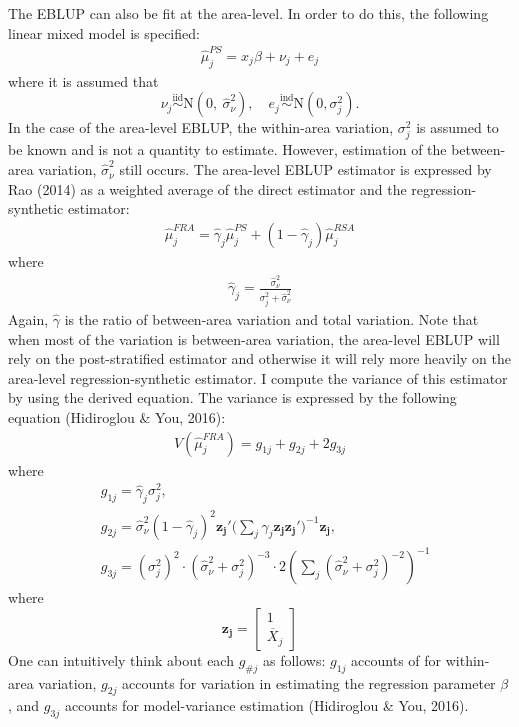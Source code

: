 \documentclass[12pt,twoside]{reedthesis}
\begin{document}
The EBLUP can also be fit at the area-level. In order to do this, the following linear mixed model is specified:
\begin{align}
\hat\mu_{j}^{PS} = x_j \beta + \nu_j + e_j \label{eq:area-mod}
\end{align}
where it is assumed that
\[
 \newcommand\myeq{\stackrel{\mathclap{\normalfont\mbox{s}}}{~}}
\nu_j \stackrel{\text{iid}}{\sim} \text{N}(0,~ \hat\sigma^2_{\nu}), \quad e_{j} \stackrel{\text{ind}}{\sim}\text{N}(0, \sigma^2_j).
\]
In the case of the area-level EBLUP, the within-area variation, \(\sigma^2_j\) is assumed to be known and is not a quantity to estimate. However, estimation of the between-area variation, \(\hat\sigma_\nu^2\) still occurs. The area-level EBLUP estimator is expressed by Rao (2014) as a weighted average of the direct estimator and the regression-synthetic estimator:
\begin{align}
\hat \mu_j^{FRA} = \hat\gamma_j \hat\mu_j^{PS} + (1 - \hat\gamma_j) \hat\mu_j^{RSA} \label{eq:eblup-area-weight}
\end{align}
where
\begin{align}
\hat \gamma_j = \frac{\hat \sigma_\nu^2}{\sigma^2_j + \hat\sigma_\nu^2}
\end{align}
Again, \(\hat\gamma\) is the ratio of between-area variation and total variation. Note that when most of the variation is between-area variation, the area-level EBLUP will rely on the post-stratified estimator and otherwise it will rely more heavily on the area-level regression-synthetic estimator. I compute the variance of this estimator by using the derived equation. The variance is expressed by the following equation (Hidiroglou \& You, 2016):
\begin{align}
\hat V(\hat\mu_j^{FRA}) = g_{1j} + g_{2j} + 2g_{3j}
\end{align}
where
\begin{align*}
&g_{1j} = \hat\gamma_j \sigma^2_j, \\
&g_{2j} = \hat\sigma^2_\nu (1 - \hat\gamma_j)^2 \mathbf{z_j'} \Big(\sum_{j} \hat\gamma_j \mathbf{z_j} \mathbf{z_j'}\Big)^{-1} \mathbf{z_j}, \\
&g_{3j} = (\sigma^2_j)^2 \cdot (\hat\sigma^2_\nu + \sigma^2_j)^{-3} \cdot 2(\sum_{j} (\hat\sigma^2_\nu + \sigma^2_j)^{-2})^{-1}
\end{align*}
where
\[
\mathbf{z_j} = \begin{bmatrix}
1 \\ \overline X_j
\end{bmatrix}
\]
One can intuitively think about each \(g_{\#j}\) as follows: \(g_{1j}\) accounts of for within-area variation, \(g_{2j}\) accounts for variation in estimating the regression parameter \(\beta\), and \(g_{3j}\) accounts for model-variance estimation (Hidiroglou \& You, 2016).
\end{document}
